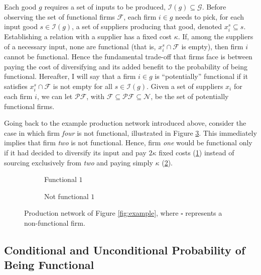 \documentclass[american, abstract=on]{scrartcl}
\newcommand{\inputTikZ}[2]{%
      \scalebox{#1}{}  
    }
\newcommand{\F}{\mathcal{F}}
\newcommand{\I}{\mathcal{I}}
\newcommand{\N}{\mathcal{N}}
\newcommand{\PF}{\mathcal{P} \F}
\begin{document}
Each good $g$ requires a set of inputs to be produced, $\mathcal{I}(g) \subseteq \mathcal{G}$. Before observing the set of functional firms $\F$, each firm $i \in g$ needs to pick, for each input good $s \in \mathcal{I}(g)$, a set of suppliers producing that good, denoted $x_i^s \subseteq s$. Establishing a relation with a supplier has a fixed cost $\kappa$. If, among the suppliers of a necessary input, none are functional (that is, $x_i^s \cap \F$ is empty), then firm $i$ cannot be functional. Hence the fundamental trade-off that firms face is between paying the cost of diversifying and its added benefit to the probability of being functional. Hereafter, I will say that a firm $i \in g$ is ``potentially'' functional if it satisfies $x_i^s \cap \F$ is not empty for all $s \in \I(g)$. Given a set of suppliers $x_i$ for each firm $i$, we can let $\PF$, with $\F \subseteq \PF \subseteq \N$, be the set of potentially functional firms.

Going back to the example production network introduced above, consider the case in which firm \textit{four} is not functional, illustrated in Figure \ref{fig:functional_example}. This immediately implies that firm \textit{two} is not functional. Hence, firm \textit{one} would be functional only if it had decided to diversify its input and pay $2\kappa$ fixed costs (\ref{fig:functional_example:yes}) instead of sourcing exclusively from \textit{two} and paying simply $\kappa$ (\ref{fig:functional_example:no}).

\begin{figure}[H]
  \centering
  \begin{subfigure}{.5\textwidth}
    \centering
    \inputTikZ{0.5}{diagrams/example-functional.tikz} 
    \caption{Functional $1$}
    \label{fig:functional_example:yes}  
  \end{subfigure}%
  \begin{subfigure}{.5\textwidth}
    \centering
    \inputTikZ{0.5}{diagrams/example-notfunctional.tikz} 
    \caption{Not functional $1$}
    \label{fig:functional_example:no}
  \end{subfigure}
  \caption{Production network of Figure \ref{fig:example}, where $\square$ represents a non-functional firm.}
  \label{fig:functional_example}
\end{figure}

\subsection{Conditional and Unconditional Probability of Being Functional}
\end{document}
